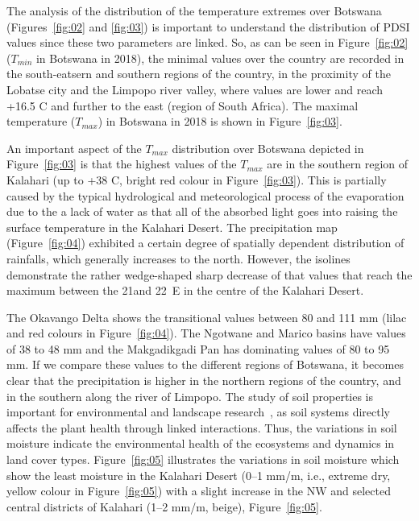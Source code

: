 \documentclass[ijgi,article,accept,pdftex,moreauthors]{Definitions/mdpi}
\begin{document}
The analysis of the distribution of the temperature extremes over Botswana (Figures~\ref{fig:02} and \ref{fig:03}) is important to understand the distribution of PDSI values since these two parameters are linked. So, as can be seen in Figure~\ref{fig:02} ($T_{min}$ in Botswana in 2018), the minimal values over the country are recorded in the south-eatsern and southern regions of the country, in the proximity of the Lobatse city and the Limpopo river valley, where values are lower and reach +16.5 \degree C and further to the east (region of South Africa). The maximal temperature ($T_{max}$) in Botswana in 2018 is shown in Figure~\ref{fig:03}. 

An important aspect of the $T_{max}$ distribution over Botswana depicted in Figure~\ref{fig:03} is that the highest values of the $T_{max}$ are in the southern region of Kalahari (up to +38 \degree C, bright red colour in Figure~\ref{fig:03}). This is partially caused by the typical hydrological and meteorological process of the evaporation due to the a lack of water as that all of the absorbed light goes into raising the surface temperature in the Kalahari Desert. The precipitation map (Figure~\ref{fig:04}) exhibited a certain degree of spatially dependent distribution of rainfalls, which generally increases to the north. However, the isolines demonstrate the rather wedge-shaped sharp decrease of that values that reach the maximum between the 21\degree and 22\degree~E in the centre of the Kalahari Desert.  

The Okavango Delta shows the transitional values between 80 and 111 mm (lilac and red colours in Figure~\ref{fig:04}). The Ngotwane and Marico basins have values of 38 to 48 mm and the Makgadikgadi Pan has dominating values of 80 to 95 mm. If we compare these values to the different regions of Botswana, it becomes clear that the precipitation is higher in the northern regions of the country, and in the southern along the river of Limpopo. %
The study of soil properties is important for environmental and landscape \mbox{research~\cite{Totolo,Lindh202210,Mosweu,Lemenkov202103,Zeilhofer},} as soil systems directly affects the plant health through linked interactions. Thus, the variations in soil moisture indicate the environmental health of the ecosystems and dynamics in land cover types. Figure~\ref{fig:05} illustrates the variations in soil moisture which show the least moisture in the Kalahari Desert (0--1 mm/m, i.e., extreme dry, yellow colour in Figure~\ref{fig:05}) with a slight increase in the NW and selected central districts of Kalahari (1--2 mm/m, beige), Figure~\ref{fig:05}. 
\end{document}
